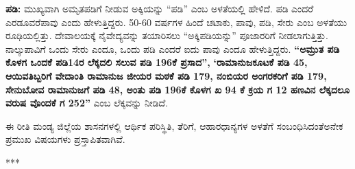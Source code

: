 \textbf{ಪಡಿ:} ಮುಖ್ಯವಾಗಿ ಅಮೃತಪಡಿಗೆ ನೀಡುವ ಅಕ್ಕಿಯನ್ನು “ಪಡಿ” ಎಂಬ ಅಳತೆಯಲ್ಲಿ ಹೇಳಿದೆ. ಪಡಿ ಎಂದರೆ ಎರಡೂವರೆಪಾವು ಎಂದು ಹೇಳುತ್ತಿದ್ದರು. 50-60 ವರ್ಷಗಳ ಹಿಂದೆ ಚಟಾಕು, ಪಾವು, ಪಡಿ, ಸೇರು ಎಂಬ ಅಳತೆಯು ರೂಢಿಯಲ್ಲಿತ್ತು. ದೇವಾಲಯಕ್ಕೆ ನೈವೇದ್ಯವನ್ನು ತಯಾರಿಸಲು “ಅಕ್ಕಿಪಡಿಯನ್ನು” ಪೂಜಾರರಿಗೆ ನೀಡಲಾಗುತ್ತಿತ್ತು. ನಾಲ್ಕುಪಾವಿಗೆ ಒಂದು ಸೇರು ಎಂದೂ, ಒಂದು ಪಡಿ ಎಂದರೆ ಐದು ಪಾವು ಎಂದೂ ಹೇಳುತ್ತಿದ್ದರು. \textbf{“ಅಮ್ರುತ ಪಡಿ ಕೊಳಗ ಒಂದಕೆ ಪಡಿ14ರ ಲೆಕ್ಕದಲಿ ಸಲುವ ಪಡಿ 196ಕೆ ಪ್ರಸಾದ”,} \textbf{‘ರಾಮಾನುಜಕೂಟಕೆ ಪಡಿ 45, ಆಯಿವತಿಬ್ಬರಿಗೆ ವೇದಾಂತಿ ರಾಮಾನುಜ ಜೀಯರ ಮಠಕೆ ಪಡಿ 179, ನಂಬಿಯರ ಅಂಗರಕರಿಗೆ ಪಡಿ 179, ಸೇನುಬೋವ ರಾಮಾನುಜಗೆ ಪಡಿ 48, ಅಂತು ಪಡಿ 196ಕೆ ಕೊಳಗ ಖ 94 ಕೆ ಕ್ರಯ ಗ 12 ಹಣವಿನ ಲೆಕ್ಕದಲೂ ವರುಷ ವೊಂದಕೆ ಗ 252”} ಎಂಬ ಲೆಕ್ಕವನ್ನು ನೀಡಿದೆ.

\newpage

ಈ ರೀತಿ ಮಂಡ್ಯ ಜಿಲ್ಲೆಯ ಶಾಸನಗಳಲ್ಲಿ ಆರ್ಥಿಕ ಪರಿಸ್ಥಿತಿ, ತೆರಿಗೆ, ಆಹಾರಧಾನ್ಯಗಳ ಅಳತೆಗೆ ಸಂಬಂಧಿಸಿದಂತೆ\break ಅನೇಕ ಪ್ರಮುಖ ವಿಷಯಗಳು ಪ್ರಸ್ತಾಪಿತವಾಗಿವೆ.

\begin{center}
***
\end{center}

\theendnotes

